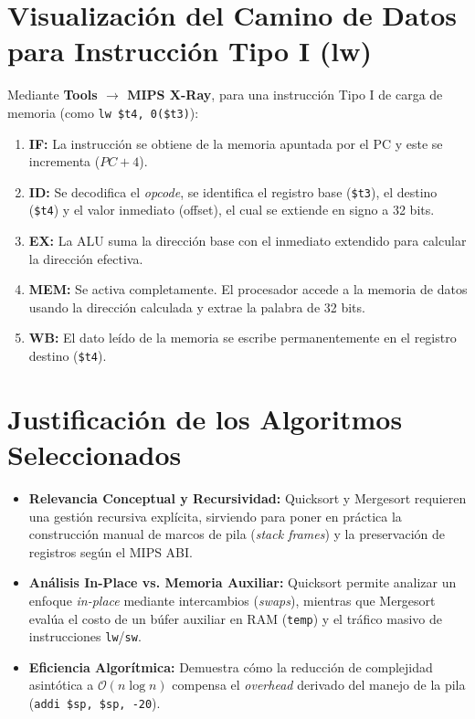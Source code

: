 \documentclass[12pt,a4paper]{article}
\begin{document}
	
	\section{Visualización del Camino de Datos para Instrucción Tipo I (lw)}
	
	Mediante \textbf{Tools $\rightarrow$ MIPS X-Ray}, para una instrucción Tipo I de carga de memoria (como \texttt{lw \$t4, 0(\$t3)}):
	\begin{enumerate}
		\item \textbf{IF:} La instrucción se obtiene de la memoria apuntada por el PC y este se incrementa ($PC + 4$).
		\item \textbf{ID:} Se decodifica el \textit{opcode}, se identifica el registro base (\texttt{\$t3}), el destino (\texttt{\$t4}) y el valor inmediato (offset), el cual se extiende en signo a 32 bits.
		\item \textbf{EX:} La ALU suma la dirección base con el inmediato extendido para calcular la dirección efectiva.
		\item \textbf{MEM:} Se activa completamente. El procesador accede a la memoria de datos usando la dirección calculada y extrae la palabra de 32 bits.
		\item \textbf{WB:} El dato leído de la memoria se escribe permanentemente en el registro destino (\texttt{\$t4}).
	\end{enumerate}
	
	
	\section{Justificación de los Algoritmos Seleccionados}
	
	\begin{itemize}
		\item \textbf{Relevancia Conceptual y Recursividad:} Quicksort y Mergesort requieren una gestión recursiva explícita, sirviendo para poner en práctica la construcción manual de marcos de pila (\textit{stack frames}) y la preservación de registros según el MIPS ABI.
		\item \textbf{Análisis In-Place vs. Memoria Auxiliar:} Quicksort permite analizar un enfoque \textit{in-place} mediante intercambios (\textit{swaps}), mientras que Mergesort evalúa el costo de un búfer auxiliar en RAM (\texttt{temp}) y el tráfico masivo de instrucciones \texttt{lw}/\texttt{sw}.
		\item \textbf{Eficiencia Algorítmica:} Demuestra cómo la reducción de complejidad asintótica a $\mathcal{O}(n \log n)$ compensa el \textit{overhead} derivado del manejo de la pila (\texttt{addi \$sp, \$sp, -20}).
	\end{itemize}
	
\end{document}
